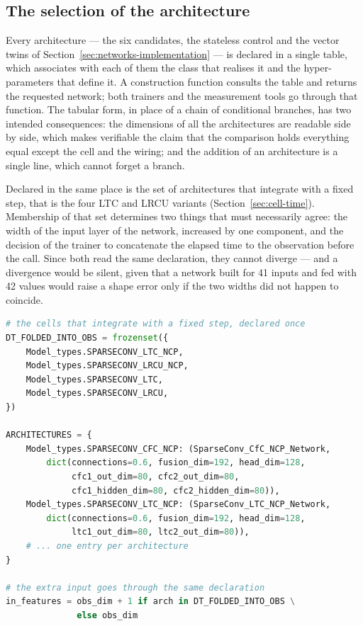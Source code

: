 \subsection{The selection of the architecture}

Every architecture --- the six candidates, the stateless control and the vector
twins of Section~\ref{sec:networks-implementation} --- is declared in a single
table, which associates with each of them the class that realises it and the
hyper-parameters that define it. A
construction function consults the table and returns the requested network; both
trainers and the measurement tools go through that function. The tabular form,
in place of a chain of conditional branches, has two intended consequences: the
dimensions of all the architectures are readable side by side, which makes
verifiable the claim that the comparison holds everything equal except the cell
and the wiring; and the addition of an architecture is a single line, which
cannot forget a branch.

Declared in the same place is the set of architectures that integrate with a
fixed step, that is the four LTC and LRCU variants
(Section~\ref{sec:cell-time}). Membership of that set determines two things that
must necessarily agree: the width of the input layer of the network, increased
by one component, and the decision of the trainer to concatenate the elapsed
time to the observation before the call. Since both read the same declaration,
they cannot diverge --- and a divergence would be silent, given that a network
built for \num{41} inputs and fed with \num{42} values would raise a shape error
only if the two widths did not happen to coincide.

\begin{lstlisting}[language=Python, caption={The architecture table and the declaration of the fixed step.}, label={lst:table}]
# the cells that integrate with a fixed step, declared once
DT_FOLDED_INTO_OBS = frozenset({
    Model_types.SPARSECONV_LTC_NCP,
    Model_types.SPARSECONV_LRCU_NCP,
    Model_types.SPARSECONV_LTC,
    Model_types.SPARSECONV_LRCU,
})

ARCHITECTURES = {
    Model_types.SPARSECONV_CFC_NCP: (SparseConv_CfC_NCP_Network,
        dict(connections=0.6, fusion_dim=192, head_dim=128,
             cfc1_out_dim=80, cfc2_out_dim=80,
             cfc1_hidden_dim=80, cfc2_hidden_dim=80)),
    Model_types.SPARSECONV_LTC_NCP: (SparseConv_LTC_NCP_Network,
        dict(connections=0.6, fusion_dim=192, head_dim=128,
             ltc1_out_dim=80, ltc2_out_dim=80)),
    # ... one entry per architecture
}

# the extra input goes through the same declaration
in_features = obs_dim + 1 if arch in DT_FOLDED_INTO_OBS \
              else obs_dim
\end{lstlisting}

